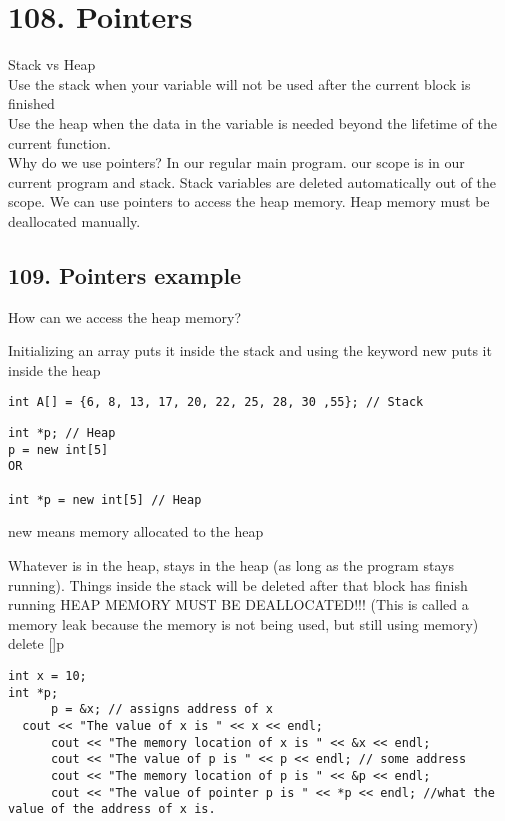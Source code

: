 \documentclass[a4paper,12pt]{book}
\begin{document}
\chapter{108. Pointers}
Stack vs Heap \\
Use the stack when your variable will not be used after the current block is finished  \\
Use the heap when the data in the variable is needed beyond the lifetime of the current function. \\ 



Why do we use pointers? 
In our regular main program. our scope is in our current program and stack. Stack variables are deleted automatically out of the scope. We can use pointers to access the heap memory. Heap memory must be deallocated manually.

\section{109. Pointers example}
How can we access the heap memory?

Initializing an array puts it inside the stack and using the keyword new puts it inside the heap
\begin{verbatim}
int A[] = {6, 8, 13, 17, 20, 22, 25, 28, 30 ,55}; // Stack
\end{verbatim}

\begin{verbatim}
int *p; // Heap
p = new int[5]
OR

int *p = new int[5] // Heap
\end{verbatim}
new means memory allocated to the heap

Whatever is in the heap, stays in the heap (as long as the program stays running). Things inside the stack will be deleted after that block has finish running 
HEAP MEMORY MUST BE DEALLOCATED!!! (This is called a memory leak because the memory is not being used, but still using memory)
delete []p
\begin{lstlisting}
int x = 10;
int *p;
      p = &x; // assigns address of x
  cout << "The value of x is " << x << endl;
      cout << "The memory location of x is " << &x << endl;
      cout << "The value of p is " << p << endl; // some address
      cout << "The memory location of p is " << &p << endl;
      cout << "The value of pointer p is " << *p << endl; //what the value of the address of x is.
\end{lstlisting}
\end{document}
